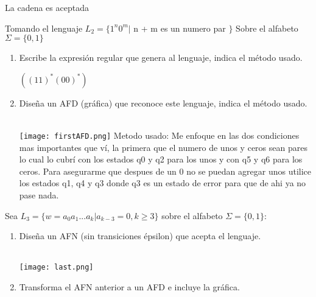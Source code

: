 \begin{questions}
\begin{enumerate}
\begin{solution}
                La cadena es aceptada
            \end{solution}
        \end{enumerate}
\question Tomando el lenguaje $L_{2}=\{1^{n}0^{m} |$ n + m es un numero par $\}$ Sobre el alfabeto $\Sigma = \{0,1\}$
        \begin{enumerate}
            \item Escribe la expresi\'on regular que genera al lenguaje, indica el m\'etodo usado.
                \begin{solution}
                    $((11)^{*}(00)^{*})$
                \end{solution}
            \item Diseña un AFD (gráfica) que reconoce este lenguaje, indica el método usado.
                \begin{solution}
                    \\
                    \texttt{[image: firstAFD.png]}
                    Metodo usado:
                    Me enfoque en las dos condiciones mas importantes que v\'i, la primera que el numero de unos y ceros
                    sean pares lo cual lo cubr\'i con los estados q0 y q2 para los unos y con q5 y q6 para los ceros.
                    Para asegurarme que despues de un 0 no se puedan agregar unos utilice los estados q1, q4 y q3 donde q3 es un 
                    estado de error para que de ahi ya no pase nada. 
                \end{solution}
        \end{enumerate}
        \question Sea $L_{3} = \{w=a_{0}a_{1}...a_{k} | a_{k-3}=0, k \geq 3\}$ sobre el alfabeto $\Sigma = \{0,1\}$:
        \begin{enumerate}
            \item Diseña un AFN (sin transiciones épsilon) que acepta el lenguaje.
            \begin{solution}
                \\
                \texttt{[image: last.png]}
            \end{solution}
            \item Transforma el AFN anterior a un AFD e incluye la gr\'afica.
        \end{enumerate}
\end{questions}


